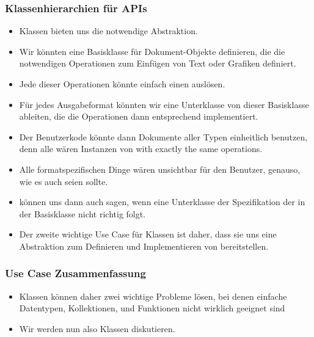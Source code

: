 \documentclass[aspectratio=169,mathserif,notheorems]{beamer}%
\begin{document}
%
\begin{frame}%
\frametitle{Klassenhierarchien für APIs}%
\begin{itemize}%
\item Klassen bieten uns die notwendige Abstraktion.%
%
\item<2-> Wir könnten eine Basisklasse  für Dokument-Objekte definieren, die die notwendigen Operationen zum Einfügen von Text oder Grafiken definiert.%
%
\item<3-> Jede dieser Operationen könnte einfach einen  auslösen.%
%
\item<4-> Für jedes Ausgabeformat könnten wir eine Unterklasse von dieser Basisklasse ableiten, die die Operationen dann entsprechend implementiert.%
%
\item<5-> Der Benutzerkode könnte dann Dokumente aller Typen einheitlich benutzen, denn alle wären Instanzen von  with exactly the same operations.%
%
\item<6-> Alle formatspezifischen Dinge wären unsichtbar für den Benutzer, genauso, wie es auch seien sollte.%
%
\item<7->  können uns dann auch sagen, wenn eine Unterklasse der Spezifikation der  in der Basisklasse nicht richtig folgt.%
%
\item<8-> Der zweite wichtige Use Case für Klassen ist daher, dass sie uns eine Abstraktion zum Definieren und Implementieren von  bereitstellen.%
\end{itemize}%
\end{frame}%
%
\begin{frame}%
\frametitle{Use Case Zusammenfassung}%
\begin{itemize}%
\item Klassen können daher zwei wichtige Probleme lösen, bei denen einfache Datentypen, Kollektionen, und Funktionen nicht wirklich geeignet sind%
%
\item<4-> Wir werden nun also Klassen diskutieren.%
\end{itemize}%
\end{frame}%
%
\end{document}

